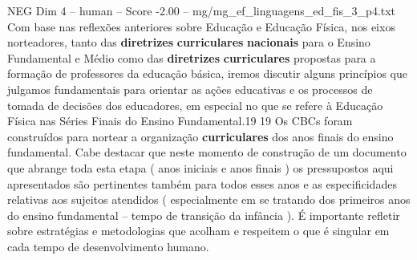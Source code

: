 \begin{textsample}{NEG Dim 4 – human – Score -2.00 – mg/mg\_ef\_linguagens\_ed\_fis\_3\_p4.txt}  \label{ex:f4_neg_010}
Com base nas reflexões anteriores sobre Educação e Educação Física, nos eixos norteadores, tanto das \textbf{diretrizes} \textbf{curriculares} \textbf{nacionais} para o Ensino Fundamental e Médio como das \textbf{diretrizes} \textbf{curriculares} propostas para a formação de professores da educação básica, iremos discutir alguns princípios que julgamos fundamentais para orientar as ações educativas e os processos de tomada de decisões dos educadores, em especial no que se refere à Educação Física nas Séries Finais do Ensino Fundamental.19 19 Os CBCs foram construídos para nortear a organização \textbf{curriculares} dos anos finais do ensino fundamental.
Cabe destacar que neste momento de construção de um documento que abrange toda esta etapa ( anos iniciais e anos finais ) os pressupostos aqui apresentados são pertinentes também para todos esses anos e as especificidades relativas aos sujeitos atendidos ( especialmente em se tratando dos primeiros anos do ensino fundamental – tempo de transição da infância ). É importante refletir sobre estratégias e metodologias que acolham e respeitem o que é singular em cada tempo de desenvolvimento humano.

\end{textsample}
